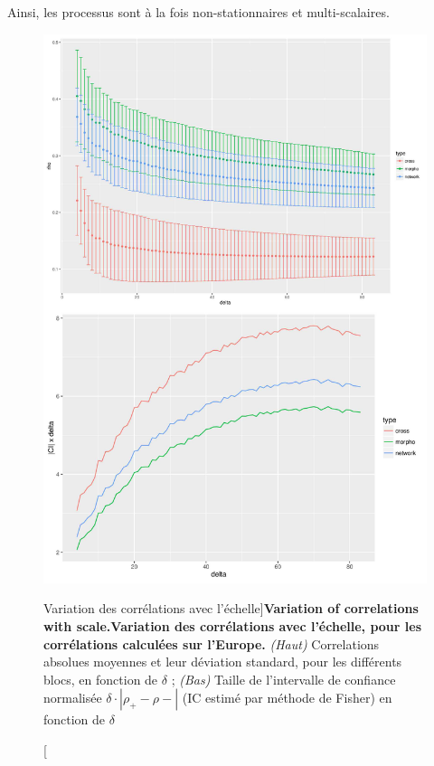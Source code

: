 Ainsi, les processus sont à la fois non-stationnaires et multi-scalaires.


\begin{figure}
\includegraphics[width=\linewidth,height=0.85\textheight]{Figures/Final/4-1-3-fig-staticcorrs-corrsdistrib}
\caption[Variation of correlations with scale][Variation des corrélations avec l'échelle]{\textbf{Variation of correlations with scale.}\label{fig:staticcorrs:corrsdistrib}}{\textbf{Variation des corrélations avec l'échelle, pour les corrélations calculées sur l'Europe.} \textit{(Haut)} Correlations absolues moyennes et leur déviation standard, pour les différents blocs, en fonction de $\delta$ ; \textit{(Bas)} Taille de l'intervalle de confiance normalisée $\delta\cdot \left|\rho_+ - \rho -\right|$ (IC estimé par méthode de Fisher) en fonction de $\delta$ \label{fig:staticcorrs:corrsdistrib}}
\end{figure}



